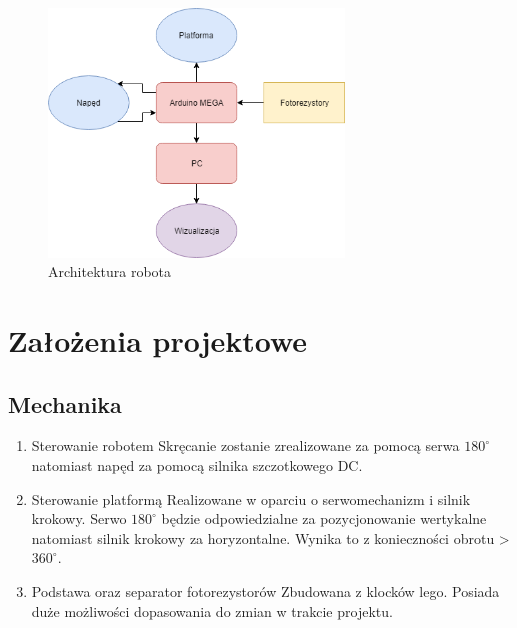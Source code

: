 \documentclass[10pt, a4paper]{article}
\begin{document}
	\begin{figure}[H]
		\centering
		\includegraphics[width=0.7\textwidth]{diag3.png}
		\caption{Architektura robota}
		\label{fig:Architektura robota}
	\end{figure}

\section{Założenia projektowe}

\subsection{Mechanika}
\begin{enumerate}
	\item Sterowanie robotem
	\newline
	Skręcanie zostanie zrealizowane za pomocą serwa $180^\circ$ natomiast napęd za pomocą silnika szczotkowego DC.
	
	\item Sterowanie platformą
	\newline
	Realizowane w oparciu o serwomechanizm i silnik krokowy. Serwo $180^\circ$ będzie odpowiedzialne za pozycjonowanie wertykalne natomiast silnik krokowy za horyzontalne. Wynika to z konieczności obrotu > $360^\circ$.
	
	\item Podstawa oraz separator fotorezystorów
	\newline
	Zbudowana z klocków lego. Posiada duże możliwości dopasowania do zmian w trakcie projektu.
	
\end{enumerate}
\end{document}
